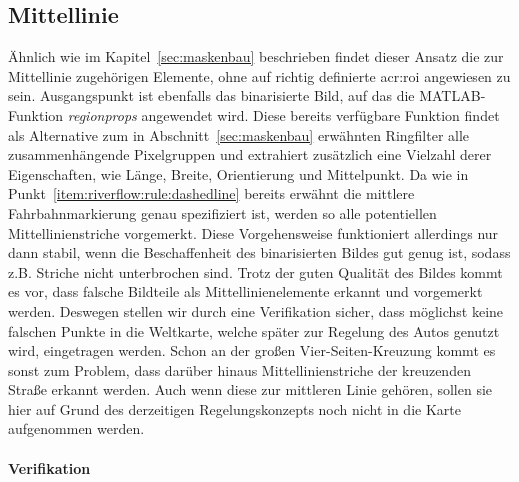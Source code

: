 \subsection{Mittellinie \dcfirstauthorshort}
\label{ssec:fahrspurerkennung:riverflow:mittellinie}
Ähnlich wie im Kapitel~\ref{sec:maskenbau} beschrieben findet dieser Ansatz die zur Mittellinie zugehörigen Elemente, ohne auf richtig definierte \gls{acr:roi} angewiesen zu sein. Ausgangspunkt ist ebenfalls das binarisierte Bild, auf das die MATLAB-Funktion \emph{regionprops} angewendet wird. Diese bereits verfügbare Funktion findet als Alternative zum in Abschnitt~\ref{sec:maskenbau} erwähnten \glqq Ringfilter\grqq{} alle zusammenhängende Pixelgruppen und extrahiert zusätzlich eine Vielzahl derer Eigenschaften, wie Länge, Breite, Orientierung und Mittelpunkt. Da wie in Punkt~\ref{item:riverflow:rule:dashedline} bereits erwähnt die mittlere Fahrbahnmarkierung genau spezifiziert ist, werden so alle potentiellen Mittellinienstriche vorgemerkt. Diese Vorgehensweise funktioniert allerdings nur dann stabil, wenn die Beschaffenheit des binarisierten Bildes gut genug ist, sodass z.B. Striche nicht unterbrochen sind. Trotz der guten Qualität des Bildes kommt es vor, dass falsche Bildteile als Mittellinienelemente erkannt und vorgemerkt werden. Deswegen stellen wir durch eine Verifikation sicher, dass möglichst keine falschen Punkte in die Weltkarte, welche später zur Regelung des Autos genutzt wird, eingetragen werden. Schon an der großen Vier-Seiten-Kreuzung kommt es sonst zum Problem, dass darüber hinaus Mittellinienstriche der kreuzenden Straße erkannt werden. Auch wenn diese zur mittleren Linie gehören, sollen sie hier auf Grund des derzeitigen Regelungskonzepts noch nicht in die Karte aufgenommen werden. 

\paragraph{Verifikation}

